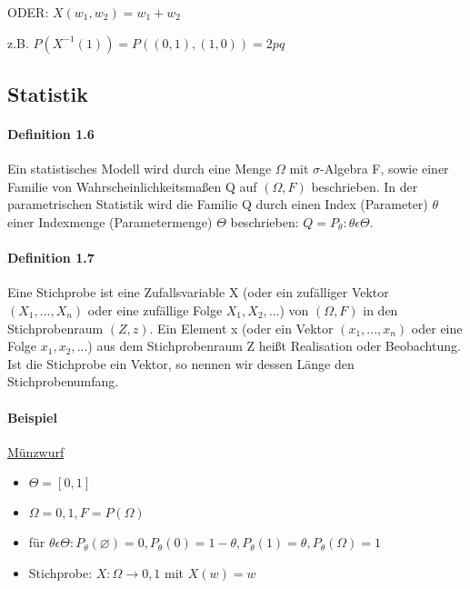 \documentclass[paper=a4, fontsize=11pt]{scrartcl}
\numberwithin{equation}{section}
\numberwithin{figure}{section}
\numberwithin{table}{section}
\begin{document}
ODER: $X(w_{1},w_{2})=w_{1}+w_{2}$

z.B. $P(X^{-1}({1})) = P({(0,1),(1,0)})= 2pq$


\subsection{Statistik}

\paragraph{Definition 1.6}

Ein statistisches Modell wird durch eine Menge $\Omega$ mit $\sigma$-Algebra F, sowie einer Familie von Wahrscheinlichkeitsmaßen Q auf $( \Omega, F)$ beschrieben. In der parametrischen Statistik wird die Familie Q durch einen Index (Parameter) $\theta$ einer Indexmenge (Parametermenge) $\Theta$ beschrieben: $Q = {P_{\theta} : \theta \epsilon \Theta}$.

\paragraph{Definition 1.7}

Eine Stichprobe ist eine Zufallsvariable X (oder ein zufälliger Vektor $(X_{1}, ..., X_{n})$ oder eine zufällige Folge $X_{1}, X_{2}, ...$) von $( \Omega, F)$ in den Stichprobenraum $(Z,z)$. Ein Element x (oder ein Vektor $(x_{1}, ..., x_{n})$ oder eine Folge $x_{1}, x_{2}, ...$) aus dem Stichprobenraum Z heißt Realisation oder Beobachtung. Ist die Stichprobe ein Vektor, so nennen wir dessen Länge den Stichprobenumfang.

\paragraph{Beispiel}

\underline{Münzwurf}

\begin{itemize}
\item $\Theta = [0,1]$
\item $\Omega = {0,1}, F = P(\Omega)$
\item für $\theta \epsilon \Theta: P_{\theta} (\varnothing) = 0, P_{\theta}({0}) = 1- \theta, P_{\theta}({1}) = \theta, P_{\theta}(\Omega) = 1$
\item Stichprobe: $X: \Omega \rightarrow {0,1}$ mit $X(w) = w$
\end{itemize}
\end{document}
